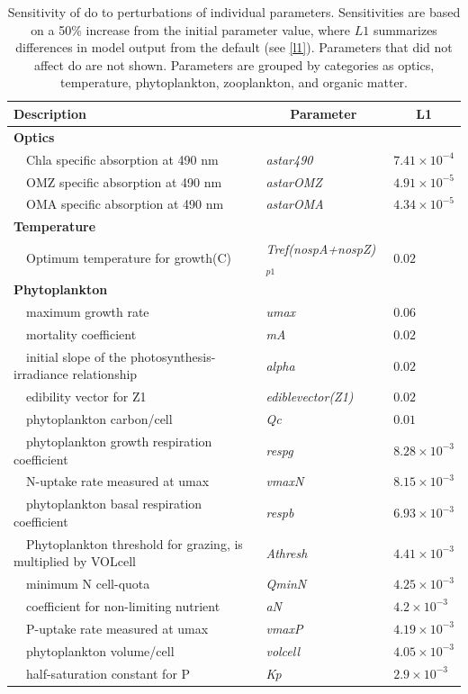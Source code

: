\documentclass[letterpaper,12pt,oneside]{article}\usepackage[]{graphicx}\usepackage[]{color}
\begin{document}
\begin{table}[!tbp]
{\footnotesize
\caption{Sensitivity of \ac{do} to perturbations of individual parameters.  Sensitivities are based on a 50\% increase from the initial parameter value, where $L1$ summarizes differences in model output from the default (see \cref{l1}).  Parameters that did not affect \ac{do} are not shown.  Parameters are grouped by categories as optics, temperature, phytoplankton, zooplankton, and organic matter.\label{tab:dosens}} 
\begin{center}
\begin{tabular}{lll}
\hline\hline
\multicolumn{1}{l}{Description}&\multicolumn{1}{c}{Parameter}&\multicolumn{1}{c}{L1}\tabularnewline
\hline
{\bfseries Optics}&&\tabularnewline
~~Chla specific absorption at 490 nm&\textit{astar490}&$7.41\times 10^{-4}$\tabularnewline
~~OMZ specific absorption at 490 nm&\textit{astarOMZ}&$4.91\times 10^{-5}$\tabularnewline
~~OMA specific absorption at 490 nm&\textit{astarOMA}&$4.34\times 10^{-5}$\tabularnewline
\hline
{\bfseries Temperature}&&\tabularnewline
~~Optimum temperature for growth(C)&\textit{Tref(nospA+nospZ)$_{p1}$}&$0.02$\tabularnewline
\hline
{\bfseries Phytoplankton}&&\tabularnewline
~~maximum growth rate&\textit{umax}&$0.06$\tabularnewline
~~mortality coefficient&\textit{mA}&$0.02$\tabularnewline
~~initial slope of the photosynthesis-irradiance relationship&\textit{alpha}&$0.02$\tabularnewline
~~edibility vector for Z1&\textit{ediblevector(Z1)}&$0.02$\tabularnewline
~~phytoplankton carbon/cell&\textit{Qc}&$0.01$\tabularnewline
~~phytoplankton growth respiration coefficient&\textit{respg}&$8.28\times 10^{-3}$\tabularnewline
~~N-uptake rate measured at umax&\textit{vmaxN}&$8.15\times 10^{-3}$\tabularnewline
~~phytoplankton basal respiration coefficient&\textit{respb}&$6.93\times 10^{-3}$\tabularnewline
~~Phytoplankton threshold for grazing, is multiplied by VOLcell&\textit{Athresh}&$4.41\times 10^{-3}$\tabularnewline
~~minimum N cell-quota&\textit{QminN}&$4.25\times 10^{-3}$\tabularnewline
~~coefficient for non-limiting nutrient&\textit{aN}&$4.2\times 10^{-3}$\tabularnewline
~~P-uptake rate measured at umax&\textit{vmaxP}&$4.19\times 10^{-3}$\tabularnewline
~~phytoplankton volume/cell&\textit{volcell}&$4.05\times 10^{-3}$\tabularnewline
~~half-saturation constant for P&\textit{Kp}&$2.9\times 10^{-3}$\tabularnewline

\end{tabular}
\end{center}}
\end{table}
\end{document}

